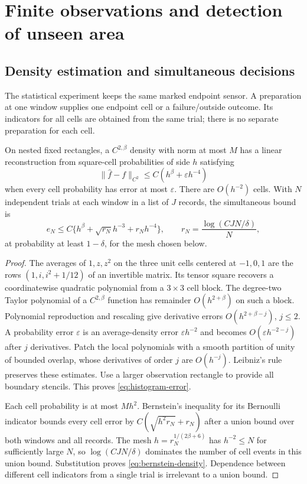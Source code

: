 \section{Finite observations and detection of unseen area}\label{sec:statistics}
\subsection{Density estimation and simultaneous decisions}
The statistical experiment keeps the same marked endpoint sensor. A
preparation at one window supplies one endpoint cell or a failure/outside
outcome. Its indicators for all cells are obtained from the same trial;
there is no separate preparation for each cell.

\begin{lemma}\label{lem:histogram}
On nested fixed rectangles, a $C^{2,\beta}$ density with norm at most
$M$ has a linear reconstruction from square-cell probabilities of side
$h$ satisfying
\begin{equation}\label{eq:histogram-error}
 \|\widehat f-f\|_{C^2}\le C(h^\beta+\varepsilon h^{-4})
\end{equation}
when every cell probability has error at most $\varepsilon$. There
are $O(h^{-2})$ cells. With $N$ independent trials at each window in
a list of $J$ records, the simultaneous bound is
\begin{equation}\label{eq:bernstein-density}
 e_N\le C\{h^\beta+\sqrt{r_N}h^{-3}+r_Nh^{-4}\},\qquad
 r_N=\frac{\log(CJN/\delta)}{N},
\end{equation}
at probability at least $1-\delta$, for the mesh chosen below.
\end{lemma}
\begin{proof}
The averages of $1,z,z^2$ on the three unit cells centered at $-1,0,1$
are the rows $(1,i,i^2+1/12)$ of an invertible matrix. Its tensor square
recovers a coordinatewise quadratic polynomial from a $3\times3$ cell
block. The degree-two Taylor polynomial of a $C^{2,\beta}$ function
has remainder $O(h^{2+\beta})$ on such a block. Polynomial reproduction
and rescaling give derivative errors $O(h^{2+\beta-j})$, $j\le2$.
A probability error $\varepsilon$ is an average-density error
$\varepsilon h^{-2}$ and becomes $O(\varepsilon h^{-2-j})$ after
$j$ derivatives. Patch the local polynomials with a smooth partition of
unity of bounded overlap, whose derivatives of order $j$ are $O(h^{-j})$.
Leibniz's rule preserves these estimates. Use a larger observation
rectangle to provide all boundary stencils. This proves
\eqref{eq:histogram-error}.

Each cell probability is at most $Mh^2$. Bernstein's inequality for
its Bernoulli indicator bounds every cell error by
$C(\sqrt{h^2r_N}+r_N)$ after a union bound over both windows and
all records. The mesh $h=r_N^{1/(2\beta+6)}$ has $h^{-2}\le N$
for sufficiently large $N$, so $\log(CJN/\delta)$ dominates the
number of cell events in this union bound. Substitution proves
\eqref{eq:bernstein-density}. Dependence between different cell
indicators from a single trial is irrelevant to a union bound.
\end{proof}


